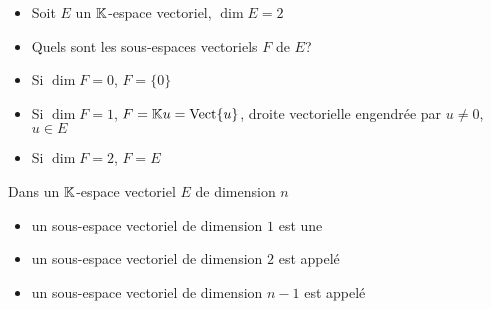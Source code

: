 \begin{frame}
\begin{exemple}
\begin{itemize}
\item 
Soit $E$ un $\mathbb{K}$-espace vectoriel, $\dim E = 2$ 
\pause
\item
Quels sont les sous-espaces vectoriels $F$ de $E$?
\pause
  \item Si $\dim F = 0$, $F = \{0\}$ 
  \pause
  \item Si $\dim F = 1$, $F = \mathbb{K} u = \mathop{\text{Vect}}\nolimits \{ u \}$, droite vectorielle  engendr\'ee par $u\neq0$, $u\in E$
  \pause
  \item Si $\dim F = 2$, $F = E$
\end{itemize}
\end{exemple}

\pause
\bigskip

Dans un $\mathbb{K}$-espace vectoriel $E$ de dimension $n$ 
\pause
\begin{itemize}
  \item un sous-espace vectoriel de dimension $1$ est 
une 
\pause
  \item un sous-espace vectoriel de dimension $2$ est appelé 
\pause
  \item un sous-espace vectoriel de dimension $n-1$ est 
appelé 
\end{itemize}


\end{frame}


